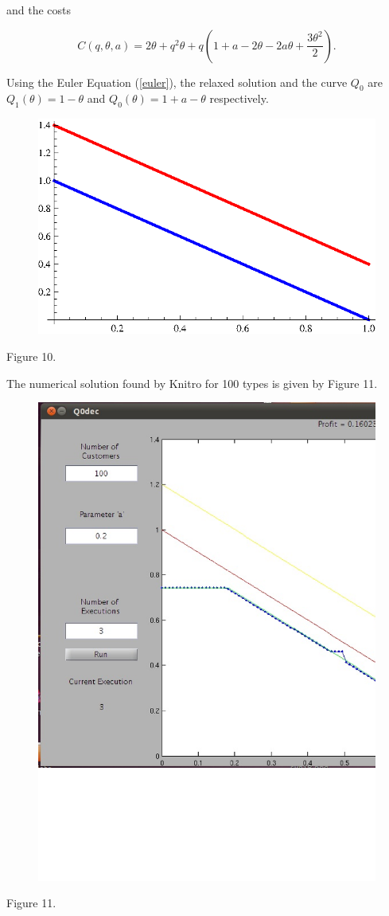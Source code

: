 and the costs

 $$C(q,\theta,a)= 2 \theta + q^2 \theta + q (1 + a - 2 \theta - 2 a \theta + \frac{3 \theta^{2}}{2}).$$

Using the  Euler Equation  (\ref{euler}), the relaxed solution and the curve $Q_{0}$ are  $Q_{1}(\theta)=1 - \theta$ 
 and $Q_{0}(\theta)=1 + a - \theta$ respectively. \\


\begin{center}
\begin{figure}[h!]
\includegraphics[scale=0.8]{q0dec.eps} 
\end{figure}
Figure 10.
\end{center}

The numerical solution found by Knitro for 100 types is given by Figure 11.\\


\begin{center}
\begin{figure}[h!]
\includegraphics[scale=0.25]{decrec.eps} 
\end{figure}
Figure 11.
\end{center}
